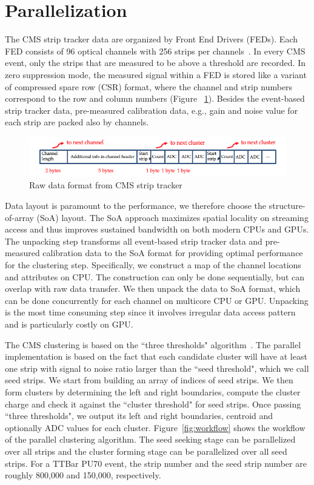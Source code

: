 \documentclass[10pt, paper=a4, UKenglish]{article}
\begin{document}
\section{Parallelization}
\label{para}
The CMS strip tracker data are organized by Front End Drivers (FEDs). Each FED consists of 96 optical channels with 256 strips per channels~\cite{Collaboration_2014}. In every CMS event, only the strips that are measured to be above a threshold are recorded. In zero suppression mode, the measured signal within a FED is stored like a variant of compressed spare row (CSR) format, where the channel and strip numbers correspond to the row and column numbers (Figure ~\ref{fig:SSTlayout}). Besides the event-based strip tracker data, pre-measured calibration data, e.g., gain and noise value for each strip are packed also by channels. 

\begin{figure}[!htb]
  \centering
  \includegraphics[scale=0.5]{SSTlayout}
  \caption{Raw data format from CMS strip tracker}
  \label{fig:SSTlayout}
\end{figure}

Data layout is paramount to the performance, we therefore choose the structure-of-array (SoA) layout. The SoA approach maximizes spatial locality on streaming access and thus improves sustained bandwidth on both modern CPUs and GPUs. The unpacking step transforms all event-based strip tracker data and pre-measured calibration data to the SoA format for providing optimal performance for the clustering step. Specifically, we construct a map of the channel locations and attributes on CPU. The construction can only be done sequentially, but can overlap with raw data transfer. We then unpack the data to SoA format, which can be done concurrently for each channel on multicore CPU or GPU. Unpacking is the most time consuming step since it involves irregular data access pattern and is particularly costly on GPU. 

The CMS clustering is based on the ``three thresholds" algorithm~\cite{Collaboration_2014}. The parallel implementation is based on the fact that each candidate cluster will have at least one strip with signal to noise ratio larger than the ``seed threshold", which we call seed strips. We start from building an array of indices of seed strips. We then form clusters by determining the left and right boundaries, compute the cluster charge and check it against the ``cluster threshold" for seed strips. Once passing ``three thresholds", we output its left and right boundaries, centroid and optionally ADC values for each cluster. Figure~\ref{fig:workflow} shows the workflow of the parallel clustering algorithm. The seed seeking stage can be parallelized over all strips and the cluster forming stage can be parallelized over all seed strips. For a TTBar PU70 event, the strip number and the seed strip number are roughly 800,000 and 150,000, respectively. 
\end{document}

